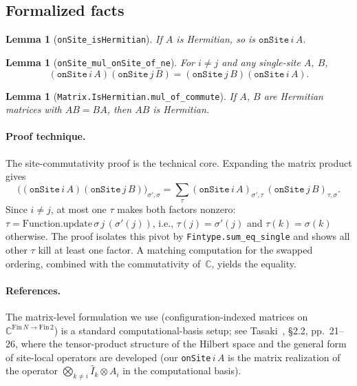 \documentclass[a4paper,11pt]{article}
\newtheorem{lemma}[theorem]{Lemma}
\begin{document}
\subsection{Formalized facts}

\begin{lemma}[\texttt{onSite\_isHermitian}]
If $A$ is Hermitian, so is $\texttt{onSite}\,i\,A$.
\end{lemma}

\begin{lemma}[\texttt{onSite\_mul\_onSite\_of\_ne}]
For $i \neq j$ and any single-site $A$, $B$,
\[
  (\texttt{onSite}\,i\,A)(\texttt{onSite}\,j\,B)
    = (\texttt{onSite}\,j\,B)(\texttt{onSite}\,i\,A).
\]
\end{lemma}

\begin{lemma}[\texttt{Matrix.IsHermitian.mul\_of\_commute}]
If $A$, $B$ are Hermitian matrices with $AB = BA$, then $AB$ is
Hermitian.
\end{lemma}

\paragraph{Proof technique.}
The site-commutativity proof is the technical core. Expanding the
matrix product gives
\[
  \bigl((\texttt{onSite}\,i\,A)(\texttt{onSite}\,j\,B)\bigr)_{\sigma',\sigma}
    = \sum_\tau
      (\texttt{onSite}\,i\,A)_{\sigma',\tau}\,
      (\texttt{onSite}\,j\,B)_{\tau,\sigma}.
\]
Since $i \neq j$, at most one $\tau$ makes both factors nonzero:
$\tau = \mathrm{Function.update}\,\sigma\,j\,(\sigma'(j))$, i.e.,
$\tau(j) = \sigma'(j)$ and $\tau(k) = \sigma(k)$ otherwise. The proof
isolates this pivot by \texttt{Fintype.sum\_eq\_single} and shows all
other $\tau$ kill at least one factor. A matching computation for the
swapped ordering, combined with the commutativity of~$\mathbb{C}$,
yields the equality.

\paragraph{References.}
The matrix-level formulation we use (configuration-indexed matrices on
$\mathbb{C}^{\mathrm{Fin}\,N \to \mathrm{Fin}\,2}$) is a standard
computational-basis setup; see Tasaki~\cite{Tasaki:QMB}, §2.2,
pp.~21--26, where the tensor-product structure of the Hilbert space
and the general form of site-local operators are developed (our
\texttt{onSite}$\,i\,A$ is the matrix realization of the operator
$\bigotimes_{k\neq i} \hat I_k \otimes A_i$ in the computational basis).
\end{document}
